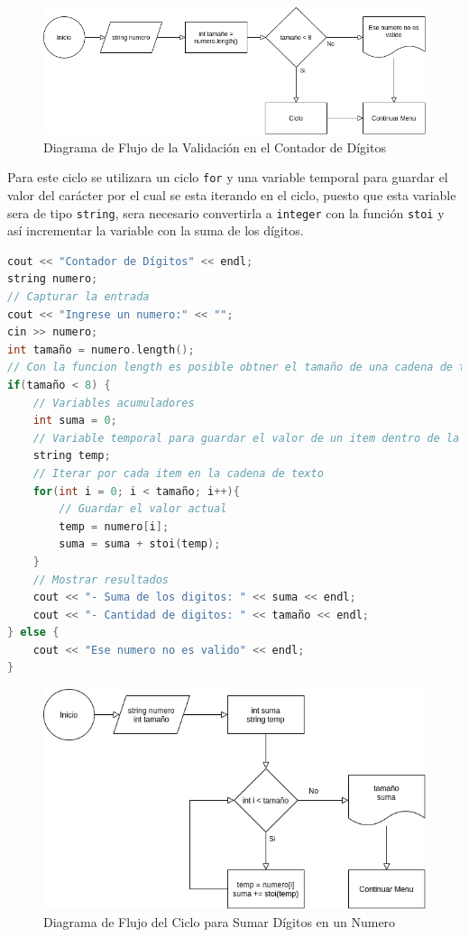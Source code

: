\documentclass[12pt]{article}
\begin{document}
\begin{figure}[H]
    \caption{Diagrama de Flujo de la Validación en el Contador de Dígitos}
    \centering
    \includegraphics[scale=0.5]{programa2_validacion.png}
\end{figure}

Para este ciclo se utilizara un ciclo \verb+for+ y una variable temporal para guardar el valor del carácter por el cual se esta iterando en el ciclo, puesto que esta variable sera de tipo \verb+string+, sera necesario convertirla a \verb+integer+ con la función \verb+stoi+ y así incrementar la variable con la suma de los dígitos.


\begin{lstlisting}[language=c++]
cout << "Contador de Dígitos" << endl;
string numero;
// Capturar la entrada
cout << "Ingrese un numero:" << "";
cin >> numero;
int tamaño = numero.length();
// Con la funcion length es posible obtner el tamaño de una cadena de texto
if(tamaño < 8) {
    // Variables acumuladores
    int suma = 0;
    // Variable temporal para guardar el valor de un item dentro de la cadena de texto
    string temp;
    // Iterar por cada item en la cadena de texto
    for(int i = 0; i < tamaño; i++){
        // Guardar el valor actual
        temp = numero[i];
        suma = suma + stoi(temp);
    }
    // Mostrar resultados
    cout << "- Suma de los digitos: " << suma << endl;
    cout << "- Cantidad de digitos: " << tamaño << endl;
} else {
    cout << "Ese numero no es valido" << endl;
}
\end{lstlisting}

\begin{figure}[H]
    \caption{Diagrama de Flujo del Ciclo para Sumar Dígitos en un Numero}
    \centering
    \includegraphics[scale=0.5]{programa2_ciclo.png}
\end{figure}
\end{document}

